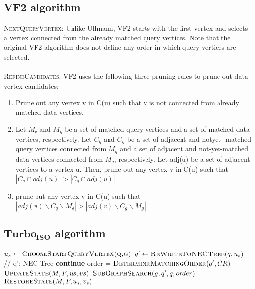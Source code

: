 \documentclass[
10pt, %
a4paper, %
oneside, %
headinclude,footinclude, %
BCOR5mm, %
]{scrartcl}
\begin{document}
\subsection{VF2 algorithm}

\textsc{NextQueryVertex:} Unlike Ullmann, VF2 starts with the first vertex and selects a vertex connected from the already matched query vertices. Note that the original VF2 algorithm does not define any order in which query vertices are selected.\\
\\
\textsc{RefineCandidates:} VF2 uses the following three pruning
rules to prune out data vertex candidates:
\begin{enumerate}
    \item Prune out any vertex v in C(u) such that v is not connected from already matched data vertices.
    \item Let $M_q$ and $M_g$ be a set of matched query vertices and a set of matched data vertices, respectively. Let $C_q$ and $C_g$ be a set of adjacent and notyet- matched query vertices connected from $M_q$ and a set of adjacent and not-yet-matched data vertices connected from $M_g$, respectively. Let adj(u) be a set of adjacent vertices to a vertex u. Then, prune out any vertex v in C(u) such that $|C_q \cap adj(u)| > |C_g \cap adj(u)|$
    \item prune out any vertex v in C(u) such that $|adj(u)\backslash C_q \backslash M_q| > |adj(v)\backslash C_g \backslash M_g|$ 
\end{enumerate}

\subsection{$\boldsymbol{Turbo_{ISO}}$ algorithm}

\begin{algorithm}
\caption{\textsc{$Turbo_{ISO}(g,q)$}}\label{euclid}
\begin{algorithmic}[1]
\State $u_s \gets \textsc{ChooseStartQueryVertex(q,g)}$
\State $q' \gets \textsc{ReWriteToNECTree}(q,u_s)$ // q': NEC Tree
        \State \textbf{continue}
    \EndIf
    \State order = $\textsc{DeterminrMatchingOrder}(q',CR)$
    \State $\textsc{UpdateState}(M,F,{us},{vs})$
    \State $\textsc{SubGraphSearch}(g,q',q,order)$
    \State $\textsc{RestoreState}(M,F,{u_s},{v_s})$
\EndFor
\end{algorithmic}
\end{algorithm}
\end{document}
